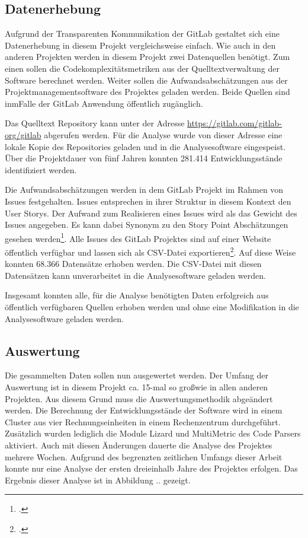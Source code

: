 \subsection{Datenerhebung}\label{gitlab-Datenerhebung}

Aufgrund der Transparenten Kommunikation der GitLab gestaltet sich eine
Datenerhebung in diesem Projekt vergleichsweise einfach. Wie auch in den
anderen Projekten werden in diesem Projekt zwei Datenquellen benötigt.
Zum einen sollen die Codekomplexitätsmetriken aus der
Quelltextverwaltung der Software berechnet werden. Weiter sollen die
Aufwandsabschätzungen aus der Projektmanagementsoftware des Projektes
geladen werden. Beide Quellen sind inmFalle der GitLab Anwendung
öffentlich zugänglich.

Das Quelltext Repository kann unter der Adresse
\url{https://gitlab.com/gitlab-org/gitlab} abgerufen werden. Für die
Analyse wurde von dieser Adresse eine lokale Kopie des Repositories
geladen und in die Analysesoftware eingespeist. Über die Projektdauer
von fünf Jahren konnten 281.414 Entwicklungsstände identifiziert werden.

Die Aufwandsabschätzungen werden in dem GitLab Projekt im Rahmen von
Issues festgehalten. Issues entsprechen in ihrer Struktur in diesem
Kontext den User Storys. Der Aufwand zum Realisieren eines Issues wird
als das Gewicht des Issues angegeben. Es kann dabei Synonym zu den Story
Point Abschätzungen gesehen werden\footcite[Vgl. ][]{ScaledAgileGitLab}. Alle
Issues des GitLab Projektes sind auf einer Website öffentlich verfügbar
und lassen sich als \ac{CSV}-Datei exportieren\footcite[Vgl. ][]{IssuesGitLabOrg}. Auf
diese Weise konnten 68.366 Datensätze erhoben werden. Die \ac{CSV}-Datei mit
diesen Datensätzen kann unverarbeitet in die Analysesoftware geladen
werden.

Insgesamt konnten alle, für die Analyse benötigten Daten erfolgreich aus
öffentlich verfügbaren Quellen erhoben werden und ohne eine Modifikation
in die Analysesoftware geladen werden.

\subsection{Auswertung}\label{gitlab-Auswertung}

Die gesammelten Daten sollen nun ausgewertet werden. Der Umfang der
Auswertung ist in diesem Projekt ca. 15-mal so gro\ss  wie in allen anderen
Projekten. Aus diesem Grund muss die Auswertungsmethodik abgeändert
werden. Die Berechnung der Entwicklungsstände der Software wird in einem
Cluster aus vier Rechnungseinheiten in einem Rechenzentrum durchgeführt.
Zusätzlich wurden lediglich die Module Lizard und MultiMetric des Code
Parsers aktiviert. Auch mit diesen Änderungen dauerte die Analyse des
Projektes mehrere Wochen. Aufgrund des begrenzten zeitlichen Umfangs
dieser Arbeit konnte nur eine Analyse der ersten dreieinhalb Jahre des
Projektes erfolgen. Das Ergebnis dieser Analyse ist in Abbildung ..
gezeigt.


